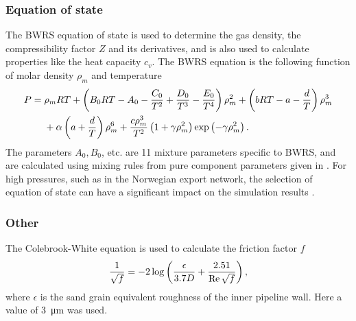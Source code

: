 \subsubsection{Equation of state}
The BWRS equation of state \cite{Starling1973Fluid} is used to determine the gas density, the compressibility factor $Z$ and its derivatives, and is also used to calculate properties like the heat capacity $c_v$. The BWRS equation is the following function of molar density $\rho_m$ and temperature
\begin{align}
\begin{split}
    P ={} &\rho_m RT 
    + \del{B_0 RT - A_0 - \frac{C_0}{T^2} + \frac{D_0}{T^3} - \frac{E_0}{T^4}}\rho_m^2 
    + \del{bRT - a - \frac{d}{T}}\rho_m^3 
    \\&
    + \alpha \del{a + \frac{d}{T}}\rho_m^6 
    + \frac{c\rho_m^3}{T^2}\del{1 + \gamma \rho_m^2} \exp\del{-\gamma \rho_m^2}
.
\end{split}
\end{align}
The parameters $A_0, B_0$, etc. are 11 mixture parameters specific to BWRS, and are calculated using mixing rules from pure component parameters given in \cite{Starling1973Fluid} .
For high pressures, such as in the Norwegian export network, the selection of equation of state can have a significant impact on the simulation results \cite{Helgaker2014Transient,Chaczykowski2009Sensitivity}.

\subsubsection{Other}
The Colebrook-White equation \cite{Colebrook1939Turbulent} is used to calculate the friction factor $f$
\begin{align}
    \frac{1}{\sqrt{f}} = -2\log \del{\frac{\epsilon}{3.7 D} + \frac{2.51}{\Reyn \sqrt{f}}}
    \label{eq:colebrookWhite}
,
\end{align}
where $\epsilon$ is the sand grain equivalent roughness of the inner pipeline wall. Here a value of \SI{3}{\micro\meter} was used.